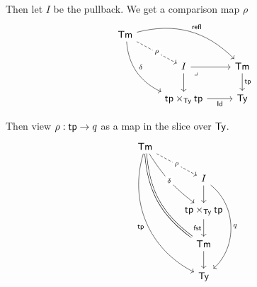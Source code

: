 Then let $I$ be the pullback.
We get a comparison map $\rho$
\[\begin{tikzcd}
	\Term \\
	& I & \Term \\
	& {\tp \times_\Type \tp} & \Type
	\arrow["\rho"{description}, dashed, from=1-1, to=2-2]
	\arrow["\refl", bend left, from=1-1, to=2-3]
	\arrow["\de", bend right, from=1-1, to=3-2]
	\arrow[from=2-2, to=2-3]
	\arrow[from=2-2, to=3-2]
	\arrow["\lrcorner"{anchor=center, pos=0.125}, draw=none, from=2-2, to=3-3]
	\arrow["\tp", from=2-3, to=3-3]
	\arrow["\Id"', from=3-2, to=3-3]
\end{tikzcd}\]

Then view $\rho : \mathsf{tp} \to q$ as a map in the slice over $\mathsf{Ty}$.
\[\begin{tikzcd}
	\Term \\
	& I \\
	& {\tp \times_\Type \tp} \\
	& \Term \\
	& \Type
	\arrow["\rho"{description}, dashed, from=1-1, to=2-2]
	\arrow["\de"{description}, bend right = 10, from=1-1, to=3-2]
	\arrow[bend right = 25, Rightarrow, no head, from=1-1, to=4-2]
	\arrow["\tp"', bend right = 40, from=1-1, to=5-2]
	\arrow[from=2-2, to=3-2]
	\arrow["q", bend left = 50, from=2-2, to=5-2]
	\arrow["\fst"', from=3-2, to=4-2]
	\arrow[from=4-2, to=5-2]
\end{tikzcd}\]

